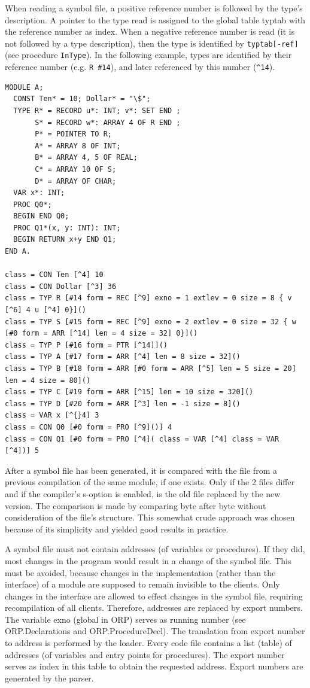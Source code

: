 When reading a symbol file, a positive reference number is followed by the type's description. A
pointer to the type read is assigned to the global table typtab with the reference number as index.
When a negative reference number is read (it is not followed by a type description), then the type is
identified by \verb|typtab[-ref]| (see procedure \verb|InType|). In the following example, types are
identified by their reference number (e.g. \verb|R #14|), and later referenced by this number
(\verb|^14|).
\begin{verbatim}
MODULE A;
  CONST Ten* = 10; Dollar* = "\$";
  TYPE R* = RECORD u*: INT; v*: SET END ;
       S* = RECORD w*: ARRAY 4 OF R END ;
       P* = POINTER TO R;
       A* = ARRAY 8 OF INT;
       B* = ARRAY 4, 5 OF REAL;
       C* = ARRAY 10 OF S;
       D* = ARRAY OF CHAR;
  VAR x*: INT;
  PROC Q0*;
  BEGIN END Q0;
  PROC Q1*(x, y: INT): INT;
  BEGIN RETURN x+y END Q1;
END A.

class = CON Ten [^4] 10
class = CON Dollar [^3] 36
class = TYP R [#14 form = REC [^9] exno = 1 extlev = 0 size = 8 { v [^6] 4 u [^4] 0}]()
class = TYP S [#15 form = REC [^9] exno = 2 extlev = 0 size = 32 { w [#0 form = ARR [^14] len = 4 size = 32] 0}]()
class = TYP P [#16 form = PTR [^14]]()
class = TYP A [#17 form = ARR [^4] len = 8 size = 32]()
class = TYP B [#18 form = ARR [#0 form = ARR [^5] len = 5 size = 20] len = 4 size = 80]()
class = TYP C [#19 form = ARR [^15] len = 10 size = 320]()
class = TYP D [#20 form = ARR [^3] len = -1 size = 8]()
class = VAR x [^{}4] 3
class = CON Q0 [#0 form = PRO [^9]()] 4
class = CON Q1 [#0 form = PRO [^4]( class = VAR [^4] class = VAR [^4])] 5
\end{verbatim}

After a symbol file has been generated, it is compared with the file from a previous compilation of
the same module, if one exists. Only if the 2 files differ and if the compiler's s-option is enabled, is
the old file replaced by the new version. The comparison is made by comparing byte after byte
without consideration of the file's structure. This somewhat crude approach was chosen because of
its simplicity and yielded good results in practice.

A symbol file must not contain addresses (of variables or procedures). If they did, most changes in
the program would result in a change of the symbol file. This must be avoided, because changes in
the implementation (rather than the interface) of a module are supposed to remain invisible to the
clients. Only changes in the interface are allowed to effect changes in the symbol file, requiring
recompilation of all clients. Therefore, addresses are replaced by export numbers. The variable
exno (global in ORP) serves as running number (see ORP.Declarations and ORP.ProcedureDecl).
The translation from export number to address is performed by the loader. Every code file contains
a list (table) of addresses (of variables and entry points for procedures). The export number serves
as index in this table to obtain the requested address. Export numbers are generated by the parser.

